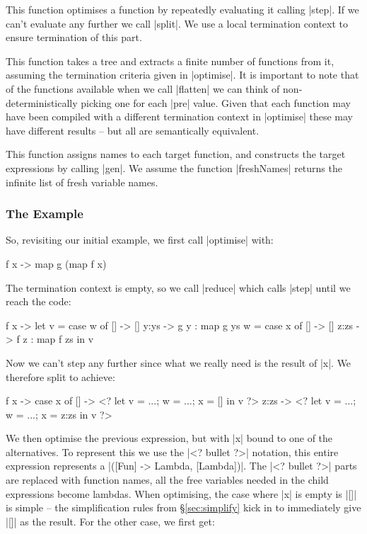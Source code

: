 \documentclass[draft]{sigplanconf}
\begin{document}
 This function optimises a function by repeatedly evaluating it calling |step|. If we can't evaluate any further we call |split|. We use a local termination context to ensure termination of this part.

 This function takes a tree and extracts a finite number of functions from it, assuming the termination criteria given in |optimise|. It is important to note that of the functions available when we call |flatten| we can think of non-deterministically picking one for each |pre| value. Given that each function may have been compiled with a different termination context in |optimise| these may have different results -- but all are semantically equivalent.

 This function assigns names to each target function, and constructs the target expressions by calling |gen|. We assume the function |freshNames| returns the infinite list of fresh variable names.

\subsubsection{The Example}
\label{sec:manager_example}

So, revisiting our initial example, we first call |optimise| with:

\begin{code}
\g f x -> map g (map f x)
\end{code}

The termination context is empty, so we call |reduce| which calls |step| until we reach the code:

\begin{code}
\g f x ->  let  v = case  w of
                          [] -> []
                          y:ys -> g y : map g ys
                w = case  x of
                          [] -> []
                          z:zs -> f z : map f zs
           in   v
\end{code}

Now we can't step any further since what we really need is the result of |x|. We therefore split to achieve:

\begin{code}
\g f x ->  case  x of
                 []    -> <? let v = ...; w = ...; x = [] in v ?>
                 z:zs  -> <? let v = ...; w = ...; x = z:zs in v ?>
\end{code}

We then optimise the previous expression, but with |x| bound to one of the alternatives. To represent this we use the |<? bullet ?>| notation, this entire expression represents a |([Fun] -> Lambda, [Lambda])|. The |<? bullet ?>| parts are replaced with function names, all the free variables needed in the child expressions become lambdas. When optimising, the case where |x| is empty is |[]| is simple -- the simplification rules from \S\ref{sec:simplify} kick in to immediately give |[]| as the result. For the other case, we first get:
\end{document}
